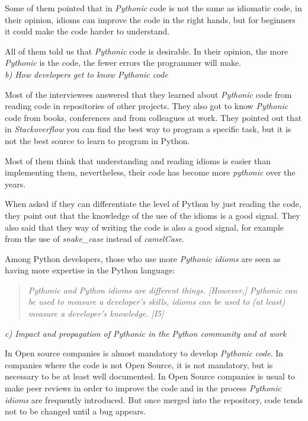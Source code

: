 \documentclass[a4paper]{article}
\begin{document}
Some of them pointed that in \textit{Pythonic} code is not the same as idiomatic code, in their opinion, idioms can improve the code in the right hands, but for beginners it could make the code harder to understand.

All of them told us that \textit{Pythonic} code is desirable. In their opinion, the more \textit{Pythonic} is the code, the fewer errors the programmer will make.
\\

\textit{b) How developers get to know Pythonic code}

Most of the interviewees answered that they learned about \textit{Pythonic} code from reading code in repositories of other projects. They also got to know \textit{Pythonic} code from books, conferences and from colleagues at work.
They pointed out that in \textit{Stackoverflow} you can find the best way to program a specific task, but it is not the best source to learn to program in Python.

Most of them think that understanding and reading idioms is easier than implementing them, nevertheless, their code has become more \textit{pythonic} over the years.

When asked if they can differentiate the level of Python by just reading the code, they point out that the knowledge of the use of the idioms is a good signal. They also said that they way of writing the code is also a good signal, for example from the use of \textit{snake\_case} instead of \textit{camelCase}.


Among Python developers, those who use more \textit{Pythonic idioms} are seen as having more expertise in the Python language:
\begin{quote}
\textit{
    \textit{Pythonic} and Python idioms are different things. [However,] \textit{Pythonic} can be used to measure a developer’s skills, idioms can be used to (at least) measure a developer’s knowledge. [I5]
}
\end{quote}



\textit{c) Impact and propagation of Pythonic in the Python community and at work}

In Open source companies is almost mandatory to develop \textit{Pythonic code}. In companies where the code is not Open Source, it is not mandatory, but is necessary to be at least well documented. In Open Source companies is usual to make peer reviews in order to improve the code and in the process \textit{Pythonic idioms} are frequently introduced. But once merged into the repository, code tends not to be changed until a bug appears.
\end{document}
